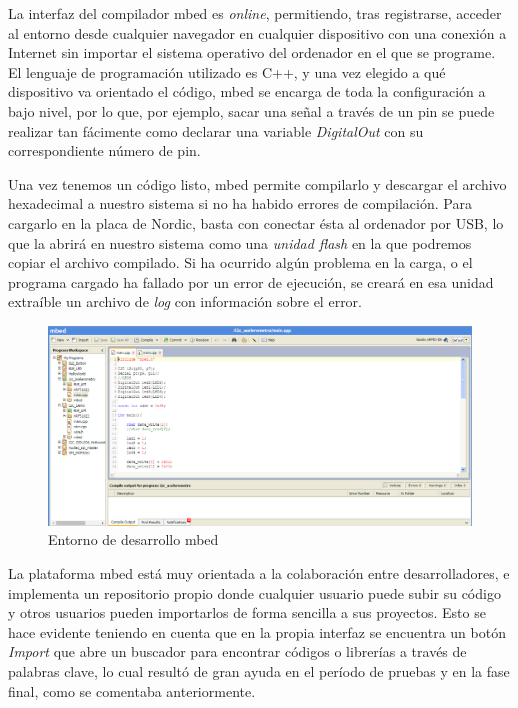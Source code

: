 La interfaz del compilador mbed es \textit{online}, permitiendo, tras registrarse, acceder al entorno desde cualquier navegador en cualquier dispositivo con una conexión a Internet sin importar el sistema operativo del ordenador en el que se programe. El lenguaje de programación utilizado es C++, y una vez elegido a qué dispositivo va orientado el código, mbed se encarga de toda la configuración a bajo nivel, por lo que, por ejemplo, sacar una señal a través de un pin se puede realizar tan fácimente como declarar una variable \textit{DigitalOut} con su correspondiente número de pin.

Una vez tenemos un código listo, mbed permite compilarlo y descargar el archivo hexadecimal a nuestro sistema si no ha habido errores de compilación. Para cargarlo en la placa de Nordic, basta con conectar ésta al ordenador por USB, lo que la abrirá en nuestro sistema como una \textit{unidad flash} en la que podremos copiar el archivo compilado. Si ha ocurrido algún problema en la carga, o el programa cargado ha fallado por un error de ejecución, se creará en esa unidad extraíble un archivo de \textit{log} con información sobre el error.

\begin{figure}[h]%
	\centering 	
    \includegraphics[width=\textwidth]{figures/mbed_compiler.PNG} %
   	\caption[Entorno de desarrollo mbed]{Entorno de desarrollo mbed}
   	\label{figuraMbedCompiler}

\end{figure}

La plataforma mbed está muy orientada a la colaboración entre desarrolladores, e implementa un repositorio propio donde cualquier usuario puede subir su código y otros usuarios pueden importarlos de forma sencilla a sus proyectos. Esto se hace evidente teniendo en cuenta que en la propia interfaz se encuentra un botón \textit{Import} que abre un buscador para encontrar códigos o librerías a través de palabras clave, lo cual resultó de gran ayuda en el período de pruebas y en la fase final, como se comentaba anteriormente.\\


